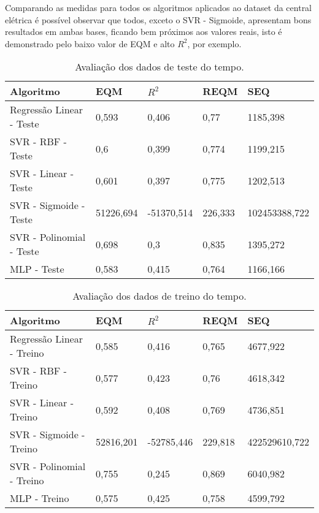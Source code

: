 Comparando as medidas para todos os algoritmos aplicados ao dataset da central elétrica é possível observar que todos, exceto o SVR - Sigmoide, apresentam bons resultados em ambas bases, ficando bem próximos aos valores reais, isto é demonstrado pelo baixo valor de EQM e alto $R^2$, por exemplo.

\begin{table}[h]
	\begin{tabular}{|l|l|l|l|l|}
		\hline
		Algoritmo                & EQM       & $R^2$         & REQM    & SEQ           \\ \hline
		Regressão Linear - Teste & 0,593     & 0,406      & 0,77    & 1185,398      \\ \hline
		SVR - RBF - Teste        & 0,6       & 0,399      & 0,774   & 1199,215      \\ \hline
		SVR - Linear - Teste     & 0,601     & 0,397      & 0,775   & 1202,513      \\ \hline
		SVR - Sigmoide - Teste   & 51226,694 & -51370,514 & 226,333 & 102453388,722 \\ \hline
		SVR - Polinomial - Teste & 0,698     & 0,3        & 0,835   & 1395,272      \\ \hline
		MLP - Teste              & 0,583     & 0,415      & 0,764   & 1166,166      \\ \hline
	\end{tabular}
	\caption{Avaliação dos dados de teste do tempo.}
	\label{tempoteste}
\centering
\end{table}

\begin{table}[h]
	\begin{tabular}{|l|l|l|l|l|}
		\hline
		Algoritmo                 & EQM       & $R^2$         & REQM    & SEQ           \\ \hline
		Regressão Linear - Treino & 0,585     & 0,416      & 0,765   & 4677,922      \\ \hline
		SVR - RBF - Treino        & 0,577     & 0,423      & 0,76    & 4618,342      \\ \hline
		SVR - Linear - Treino     & 0,592     & 0,408      & 0,769   & 4736,851      \\ \hline
		SVR - Sigmoide - Treino   & 52816,201 & -52785,446 & 229,818 & 422529610,722 \\ \hline
		SVR - Polinomial - Treino & 0,755     & 0,245      & 0,869   & 6040,982      \\ \hline
		MLP - Treino              & 0,575     & 0,425      & 0,758   & 4599,792      \\ \hline
	\end{tabular}
	\caption{Avaliação dos dados de treino do tempo.}
	\label{tempotreino}
	\centering
\end{table}

